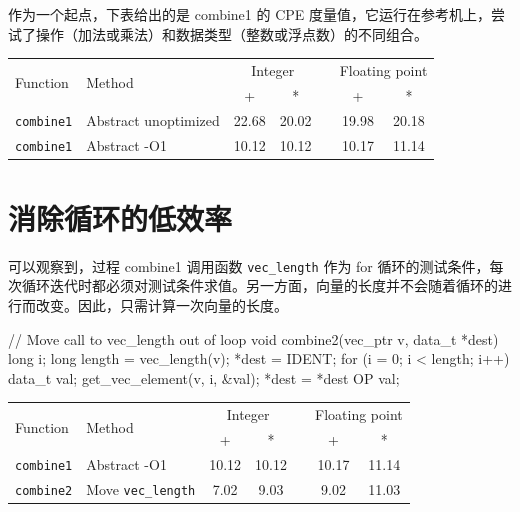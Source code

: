 作为一个起点，下表给出的是 combine1 的 CPE 度量值，它运行在参考机上，尝试了操作（加法或乘法）和数据类型（整数或浮点数）的不同组合。

\begin{table}[!ht]
    \centering
    \begin{tabular}{llccccc}
        \toprule
         \multirow{2}{*}{Function} & \multirow{2}{*}{Method} & \multicolumn{2}{c}{Integer} & & \multicolumn{2}{c}{Floating point} \\
         \cmidrule{3-4}
         \cmidrule{6-7}
          & & + & * & & + & * \\
         \midrule
         \texttt{combine1} & Abstract unoptimized & 22.68 & 20.02 & & 19.98 & 20.18 \\
         \texttt{combine1} & Abstract -O1 & 10.12 & 10.12 & & 10.17 & 11.14 \\
         \bottomrule
    \end{tabular}
\end{table}

\section{消除循环的低效率}

可以观察到，过程 combine1 调用函数 \verb|vec_length| 作为 for 循环的测试条件，每次循环迭代时都必须对测试条件求值。另一方面，向量的长度并不会随着循环的进行而改变。因此，只需计算一次向量的长度。

\begin{cppcode}
// Move call to vec_length out of loop
void combine2(vec_ptr v, data_t *dest) {
  long i;
  long length = vec_length(v);
  *dest = IDENT;
  for (i = 0; i < length; i++) {
    data_t val;
    get_vec_element(v, i, &val);
    *dest = *dest OP val;
  }
}
\end{cppcode}

\begin{table}[!ht]
    \centering
    \begin{tabular}{llccccc}
        \toprule
         \multirow{2}{*}{Function} & \multirow{2}{*}{Method} & \multicolumn{2}{c}{Integer} & & \multicolumn{2}{c}{Floating point} \\
         \cmidrule{3-4}
         \cmidrule{6-7}
          & & + & * & & + & * \\
         \midrule
         \texttt{combine1} & Abstract -O1 & 10.12 & 10.12 & & 10.17 & 11.14 \\
         \texttt{combine2} & Move \texttt{vec\_length} & 7.02 & 9.03 & & 9.02 & 11.03 \\
         \bottomrule
    \end{tabular}
\end{table}

